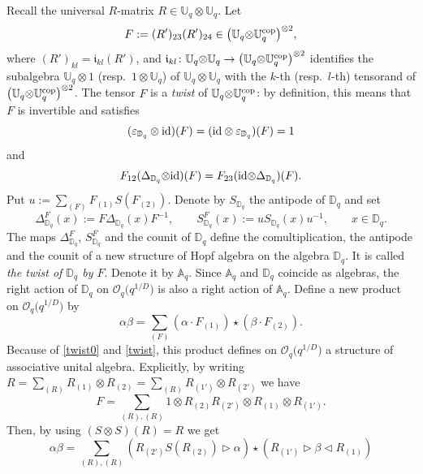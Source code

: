 \documentclass[pdftex]{sigma}%
\numberwithin{equation}{section}
\numberwithin{figure}{section}
\newcommand{\OqD}{\Oo_{q}\big(q^{1/D}\big)}
\newcommand{\mUq}{\mathbb{U}_q}
\newcommand{\Oo}{{\mathcal O}}
\begin{document}
Recall the universal $R$-matrix $R\in \mUq {\otimes} \mUq$. Let
\[F:= (R')_{23}(R')_{24} \in \big(\mUq {\otimes} \mUq^{\rm cop}\big)^{{\otimes} 2},\]
where $(R')_{kl} = \mathfrak{i}_{kl}(R')$, and $\mathfrak{i}_{kl}\colon \mUq {\otimes} \mUq \to \big(\mUq {\otimes} \mUq^{\rm cop}\big)^{{\otimes}2}$ identifies the subalgebra $\mUq \otimes 1$ (resp.\ $1\otimes \mUq$) of $\mUq {\otimes} \mUq$ with the $k$-th (resp.\ $l$-th) tensorand of $\big(\mUq {\otimes} \mUq^{\rm cop}\big)^{{\otimes} 2}$. The tensor $F$ is a {\it twist} of $\mUq {\otimes} \mUq^{\rm cop}$: by definition, this means that $F$ is invertible and satisfies
\begin{equation}\label{twist0}
(\varepsilon_{{\mathbb D}_q} \otimes {\rm id})(F) =({\rm id} \otimes \varepsilon_{{\mathbb D}_q} )(F) = 1
\end{equation}
and
\begin{equation}\label{twist}
F_{12}({\Delta}_{{\mathbb D}_q} {\otimes} {\rm id})(F) = F_{23}({\rm id} {\otimes} {\Delta}_{{\mathbb D}_q})(F).
\end{equation}
Put $\textstyle u:=\sum_{(F)}F_{(1)}S(F_{(2)})$. Denote by ${S}_{{\mathbb D}_q}$ the antipode of ${\mathbb D}_q$ and set
\begin{equation}\label{newstructure}
{\Delta}_{{\mathbb D}_q}^F(x) := F{\Delta}_{{\mathbb D}_q}(x) F^{-1} ,\qquad { S}_{{\mathbb D}_q}^F(x) := u{S}_{{\mathbb D}_q}(x)u^{-1},\qquad x\in {\mathbb D}_q.
\end{equation}
The maps ${\Delta}_{{\mathbb D}_q}^F$, ${ S}_{{\mathbb D}_q}^F$ and the counit of ${\mathbb D}_q$ define the comultiplication, the antipode and the counit of a new structure of Hopf algebra on the algebra ${\mathbb D}_q$. It is called {\it the twist of ${\mathbb D}_q$ by $F$}. Denote it by ${\mathbb A}_q$. Since ${\mathbb A}_q$ and ${\mathbb D}_q$ coincide as algebras, the right action of ${\mathbb D}_q$ on $\OqD$ is also a right action of ${\mathbb A}_q$. Define a new product on $\OqD$ by
\begin{equation}\label{mmtilde-1}
\alpha \beta = \sum_{(F)}(\alpha \cdot F_{(1)})\star(\beta\cdot F_{(2)}).
\end{equation}
Because of \eqref{twist0} and \eqref{twist}, this product defines on $\OqD$ a structure of associative unital algebra. Explicitly, by writing $\textstyle R=\sum_{(R)}R_{(1) }\otimes R_{(2)}=\sum_{(R)}R_{(1') }\otimes R_{(2')}$
we have \[F=\sum_{(R),(R)}1\otimes R_{(2)}R_{(2 ')}\otimes R_{(1)}\otimes R_{(1')}.\]
Then, by using $({S}\otimes {S})(R) =R$ we get
\begin{equation}\label{mmtilde}
\alpha\beta = \sum_{(R),(R)}(R_{(2')}{S}(R_{(2)}) \rhd \alpha) \star (R_{(1')}\rhd \beta \lhd R_{(1)})
\end{equation}
\end{document}
